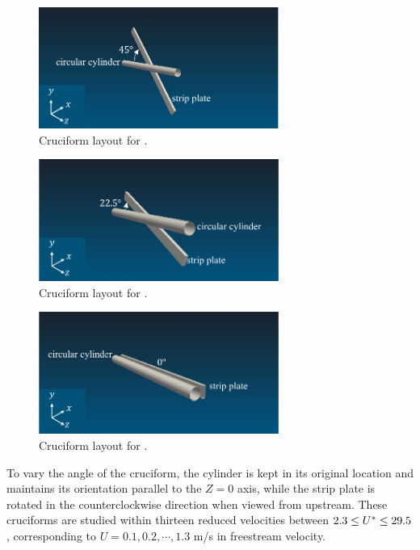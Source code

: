 \documentclass[oneside]{utmthesis}
\begin{document}
\begin{figure}[!h]
  \centering
  \hspace{1cm} \includegraphics[width=0.7\textwidth]{figs/cruciform45}
  \caption{Cruciform layout for \angth{}.}
  \label{fig:cruciform45}
\end{figure}

\begin{figure}[!h]
  \centering
  \hspace{1cm} \includegraphics[width=0.7\textwidth]{figs/cruciform225}
  \caption{Cruciform layout for \angtw{}.}
  \label{fig:cruciform225}
\end{figure}

\begin{figure}[!h]
  \centering
  \hspace{1cm} \includegraphics[width=0.7\textwidth]{figs/cruciform00}
  \caption{Cruciform layout for \angon{}.}
  \label{fig:cruciform00}
\end{figure}

To vary the angle of the cruciform, the cylinder is kept in its original location and maintains its orientation parallel to the $Z=0$ axis, while the strip plate is rotated in the counterclockwise direction when viewed from upstream. These cruciforms are studied within thirteen reduced velocities between $2.3 \leq U^{*} \leq 29.5$, corresponding to $U = 0.1, 0.2, \cdots, 1.3$ m/s in freestream velocity.
\end{document}
